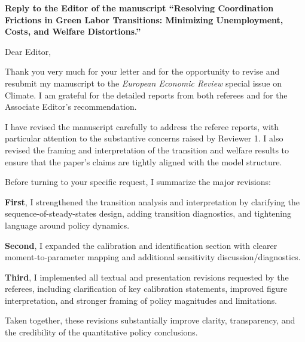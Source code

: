 \documentclass[12pt]{article}
\begin{document}
\theoremstyle{definition}
\newtheorem{definition}{Definition}
\theoremstyle{definition}
\newtheorem{result}{Result}
\theoremstyle{plain}
\newtheorem{lemma}{Lemma}
\theoremstyle{plain}
\newtheorem{proposition}{Proposition}
\theoremstyle{plain}
\newtheorem{theorem}{Theorem}
\theoremstyle{plain}
\newtheorem{corollary}{Corollary}

\begin{onehalfspacing}

\vspace{1.0cm}

\noindent \textbf{Reply to the Editor of the manuscript ``Resolving Coordination Frictions in Green Labor Transitions: Minimizing Unemployment, Costs, and Welfare Distortions.''}

\bigskip

Dear Editor,

\medskip

Thank you very much for your letter and for the opportunity to revise and resubmit my manuscript to the \textit{European Economic Review} special issue on Climate. I am grateful for the detailed reports from both referees and for the Associate Editor's recommendation.

I have revised the manuscript carefully to address the referee reports, with particular attention to the substantive concerns raised by Reviewer 1. I also revised the framing and interpretation of the transition and welfare results to ensure that the paper's claims are tightly aligned with the model structure.

Before turning to your specific request, I summarize the major revisions:

\textbf{First}, I strengthened the transition analysis and interpretation by clarifying the sequence-of-steady-states design, adding transition diagnostics, and tightening language around policy dynamics.

\textbf{Second}, I expanded the calibration and identification section with clearer moment-to-parameter mapping and additional sensitivity discussion/diagnostics.

\textbf{Third}, I implemented all textual and presentation revisions requested by the referees, including clarification of key calibration statements, improved figure interpretation, and stronger framing of policy magnitudes and limitations.

Taken together, these revisions substantially improve clarity, transparency, and the credibility of the quantitative policy conclusions.


\end{onehalfspacing}
\end{document}
